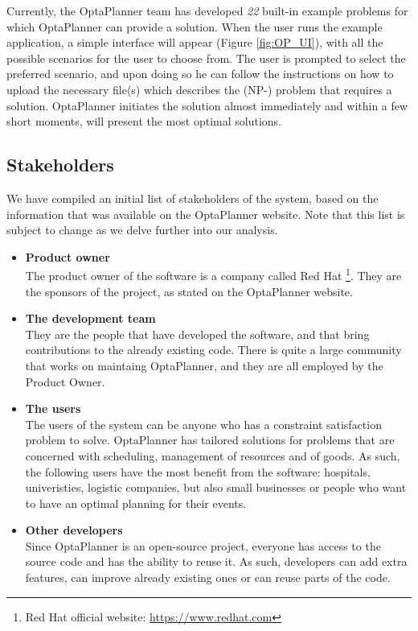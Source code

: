Currently, the OptaPlanner team has developed \textit{22} built-in example problems for which OptaPlanner can provide a solution. When the user runs the example application, a simple interface will appear (Figure \ref{fig:OP_UI}), with all the possible scenarios for the user to choose from.
The user is prompted to select the preferred scenario, and upon doing so he can follow the instructions on how to upload the necessary file(s) which describes the (NP-) problem that requires a solution. OptaPlanner initiates the solution almost immediately and within a few short moments, will present the most optimal solutions.
\subsection{Stakeholders}
We have compiled an initial list of stakeholders of the system, based on the information that was available on the OptaPlanner website. Note that this list is subject to change as we delve further into our analysis.
\begin{itemize}

    \item \textbf{Product owner}\\
    The product owner of the software is a company called Red Hat 
    \footnote{Red Hat official website: \url{https://www.redhat.com}}.
    They are the sponsors of the project, as stated on the OptaPlanner website.
    
    \item \textbf{The development team}\\
    They are the people that have developed the software, and that bring contributions to the already existing code. There is quite a large community that works on maintaing OptaPlanner, and they are all employed by the Product Owner.
    
    \item \textbf{The users}\\
    The users of the system can be anyone who has a constraint satisfaction problem to solve. OptaPlanner has tailored solutions for problems that are concerned with scheduling, management of resources and of goods. As such, the following users have the most benefit from the software: hospitals, univeristies, logistic companies, but also small businesses or people who want to have an optimal planning for their events.
    
    \item \textbf{Other developers}\\
    Since OptaPlanner is an open-source project, everyone has access to the source code and has the ability to reuse it. As such, developers can add extra features, can improve already existing ones or can reuse parts of the code.
\end{itemize}
